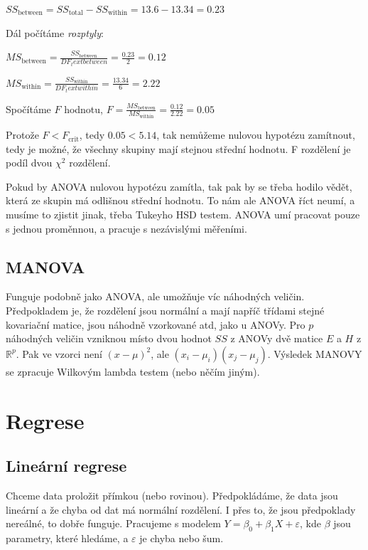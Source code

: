 \noindent $SS_\text{between} = SS_\text{total} - SS_\text{within} = 13.6 - 13.34 = 0.23$

Dál počítáme \textit{rozptyly}:

\noindent $MS_\text{between} = \frac{SS_\text{between}}{DF_text{between}} = \frac{0.23}{2} = 0.12$

\noindent $MS_\text{within} = \frac{SS_\text{within}}{DF_text{within}} = \frac{13.34}{6} = 2.22$

Spočítáme $F$ hodnotu, $F=\frac{MS_\text{between}}{MS_\text{within}} = \frac{0.12}{2.22} = 0.05$

Protože $F<F_\text{crit}$, tedy $0.05 < 5.14$, tak nemůžeme nulovou hypotézu zamítnout, tedy je možné, že všechny skupiny mají stejnou střední hodnotu. F rozdělení je podíl dvou $\chi^2$ rozdělení.

Pokud by ANOVA nulovou hypotézu zamítla, tak pak by se třeba hodilo vědět, která ze skupin má odlišnou střední hodnotu. To nám ale ANOVA říct neumí, a musíme to zjistit jinak, třeba Tukeyho HSD testem. ANOVA umí pracovat pouze s jednou proměnnou, a pracuje s nezávislými měřeními.

\subsection{MANOVA}

Funguje podobně jako ANOVA, ale umožňuje víc náhodných veličin. Předpokladem je, že rozdělení jsou normální a mají napříč třídami stejné kovariační matice, jsou náhodně vzorkované atd, jako u ANOVy. Pro $p$ náhodných veličin vzniknou místo dvou hodnot $SS$ z ANOVy dvě matice $E$ a $H$ z $\mathbb{R}^p$. Pak ve vzorci není $(x - \mu)^2$, ale $(x_i - \mu_i)(x_j - \mu_j)$. Výsledek MANOVY se zpracuje Wilkovým lambda testem (nebo něčím jiným).







\section{Regrese}

\subsection{Lineární regrese}

Chceme data proložit přímkou (nebo rovinou). Předpokládáme, že data jsou lineární a že chyba od dat má normální rozdělení. I přes to, že jsou předpoklady nereálné, to dobře funguje. Pracujeme s modelem $Y = \beta_0 + \beta_1 X + \varepsilon$, kde $\beta$ jsou parametry, které hledáme, a $\varepsilon$ je chyba nebo šum.

